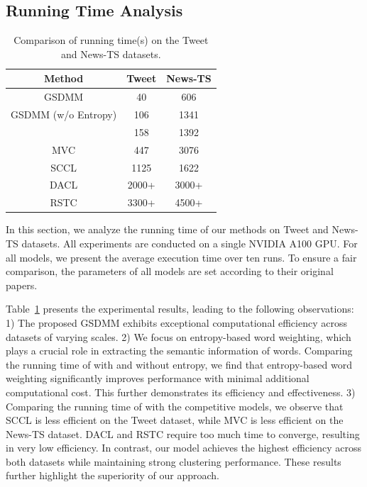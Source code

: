 \subsection{Running Time Analysis}

\begin{table}[htbp]
\caption{Comparison of running time(s) on the Tweet and News-TS datasets.}
    \centering
    \renewcommand{\arraystretch}{1.2} %
    \setlength{\tabcolsep}{9pt} %
    \label{runing_time}
    \begin{tabular}{ccc}
    \toprule
    \textbf{Method} & \textbf{Tweet} & \textbf{News-TS} \\
    \midrule
    GSDMM  & 40     & 606 \\
    GSDMM (w/o Entropy)  & 106     & 1341 \\
    \sysname{}  & 158     & 1392 \\
    MVC  & 447     & 3076 \\
    SCCL  & 1125    & 1622 \\
    DACL  & 2000+    & 3000+ \\
    RSTC  & 3300+    & 4500+ \\
    \bottomrule
    \end{tabular}
\end{table}
In this section, we analyze the running time of our methods on Tweet and News-TS datasets. All experiments are conducted on a single NVIDIA A100 GPU. For all models, we present the average execution time over ten runs. To ensure a fair comparison, the parameters of all models are set according to their original papers. 

Table~\ref{runing_time} presents the experimental results, leading to the following observations: 1) The proposed GSDMM exhibits exceptional computational efficiency across datasets of varying scales. 2) We focus on entropy-based word weighting, which plays a crucial role in extracting the semantic information of words. Comparing the running time of \sysname{} with and without entropy, we find that entropy-based word weighting significantly improves performance with minimal additional computational cost. This further demonstrates its efficiency and effectiveness. 3) Comparing the running time of \sysname{} with the competitive models, we observe that SCCL is less efficient on the Tweet dataset, while MVC is less efficient on the News-TS dataset. DACL and RSTC require too much time to converge, resulting in very low efficiency. In contrast, our model achieves the highest efficiency across both datasets while maintaining strong clustering performance. These results further highlight the superiority of our approach.

